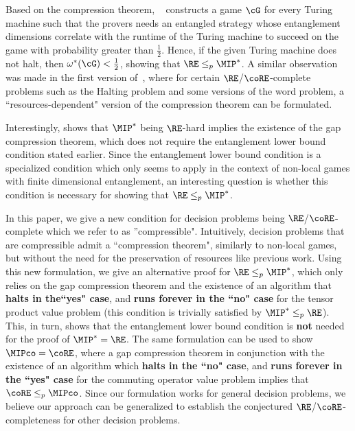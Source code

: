 Based on the compression theorem, ~\cite{jiMIPRE2022a} constructs a game $\cG$ for every Turing machine such that the provers needs an entangled strategy whose entanglement dimensions correlate with the runtime of the Turing machine to succeed on the game with probability greater than $\frac{1}{2}$. Hence, if the given Turing machine does not halt, then $\omega^*(\cG) < \frac{1}{2}$, showing that $\RE \leq_p \MIP^*$. A similar observation was made in the first version of~\cite{nezhadiRecursiveCompressionMethod2025}, where for certain $\RE$/$\coRE$-complete problems such as the Halting problem and some versions of the word problem, a ``resources-dependent" version of the compression theorem can be formulated. 

Interestingly, \cite[Theorem 6.10]{mousaviNonlocalGamesCompression2022} shows that $\MIP^*$ being $\RE$-hard implies the existence of the gap compression theorem, which does not require the entanglement lower bound condition stated earlier. Since the entanglement lower bound condition is a specialized condition which only seems to apply in the context of non-local games with finite dimensional entanglement, an interesting question is whether this condition is necessary for showing that $\RE \leq_p \MIP^*$. 

In this paper, we give a new condition for decision problems being $\RE$/$\coRE$-complete which we refer to as ''compressible". Intuitively, decision problems that are compressible admit a ``compression theorem", similarly to non-local games, but without the need for the preservation of resources like previous work. Using this new formulation, we give an alternative proof for $\RE \leq_p \MIP^*$, which only relies on the gap compression theorem and the existence of an algorithm that \textbf{halts in the``yes" case}, and \textbf{runs forever in the ``no" case} for the tensor product value problem (this condition is trivially satisfied by $\MIP^* \leq_p \RE$). This, in turn, shows that the entanglement lower bound condition is \textbf{not} needed for the proof of $\MIP^*=\RE$. The same formulation can be used to show $\MIPco=\coRE$, where a gap compression theorem in conjunction with the existence of an algorithm which \textbf{halts in the ``no" case}, and \textbf{runs forever in the ``yes" case} for the commuting operator value problem implies that $\coRE \leq_p \MIPco$. Since our formulation works for general decision problems, we believe our approach can be generalized to establish the conjectured $\RE$/$\coRE$-completeness for other decision problems. 

